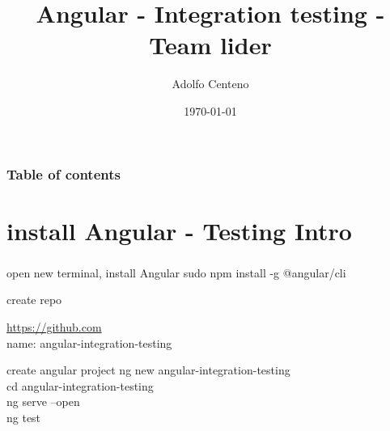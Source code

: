 \documentclass{beamer}
\begin{document}
\title{Angular - Integration testing - Team lider}  
\author{Adolfo Centeno}
\date{\today} 

\begin{frame}
\titlepage

\end{frame}

\begin{frame}\frametitle{Table of contents}\tableofcontents
\end{frame} 


\section{install Angular - Testing Intro} 





\begin{frame}\frametitle{} 


\begin{block}{open new terminal, install Angular}
sudo npm install -g @angular/cli
\end{block}

\begin{block}{create repo}

\url{https://github.com} \\
name: angular-integration-testing

\end{block}


\begin{block}{create angular project}
ng new angular-integration-testing \\
cd angular-integration-testing \\
ng serve --open \\
ng test
\end{block}

\end{frame}
\end{document}
